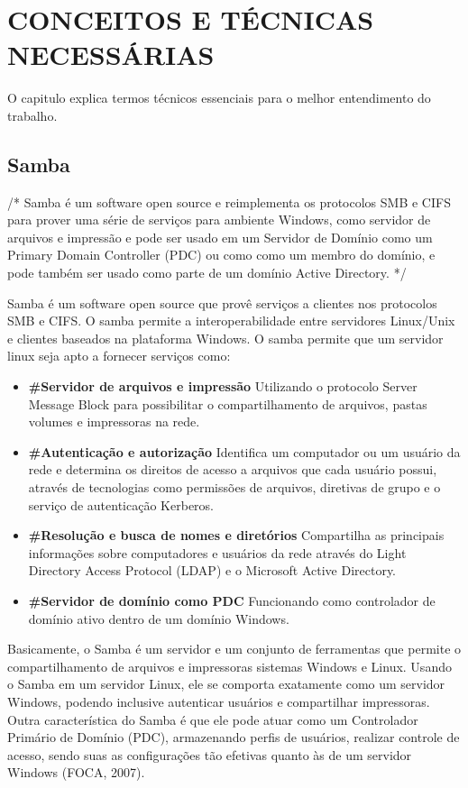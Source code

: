 \chapter{CONCEITOS E TÉCNICAS NECESSÁRIAS}

O capitulo explica termos técnicos essenciais para o melhor entendimento do trabalho.

\section{Samba}

/* Samba é um software open source e reimplementa os protocolos SMB e CIFS para prover
uma série de serviços para ambiente Windows, como servidor de arquivos e impressão e pode
ser usado em um Servidor de Domínio como um Primary Domain Controller (PDC) ou como
como um membro do domínio, e pode também ser usado como parte de um domínio Active
Directory. */

Samba é um software open source que provê serviços a clientes nos protocolos SMB e CIFS.
O samba permite a interoperabilidade entre servidores Linux/Unix e clientes baseados na
plataforma Windows.
O samba permite que um servidor linux seja apto a fornecer serviços como:
  \begin{itemize}
    \item \textbf{\#Servidor de arquivos e impressão} Utilizando o protocolo Server Message Block para possibilitar o compartilhamento de arquivos, pastas volumes e impressoras na rede.

    \item \textbf{\#Autenticação e autorização} Identifica um computador ou um usuário da rede e determina os direitos de acesso a arquivos que cada usuário possui, através de tecnologias como permissões de arquivos, diretivas de grupo e o serviço de autenticação Kerberos.

    \item \textbf{\#Resolução e busca de nomes e diretórios} Compartilha as principais informações sobre computadores e usuários da rede através do Light Directory Access Protocol (LDAP) e o Microsoft Active Directory.

    \item \textbf{\#Servidor de domínio como PDC} Funcionando como controlador de domínio ativo dentro de um domínio Windows.
  \end{itemize}

Basicamente, o Samba é um servidor e um conjunto de ferramentas que permite o compartilhamento de arquivos e impressoras sistemas Windows e Linux. Usando o Samba em um servidor Linux, ele se comporta exatamente como um servidor Windows, podendo inclusive autenticar usuários e compartilhar impressoras. Outra característica do Samba é que ele pode atuar como um Controlador Primário de Domínio (PDC), armazenando perfis de usuários, realizar controle de acesso, sendo suas as configurações tão efetivas quanto às de um servidor Windows (FOCA, 2007).

